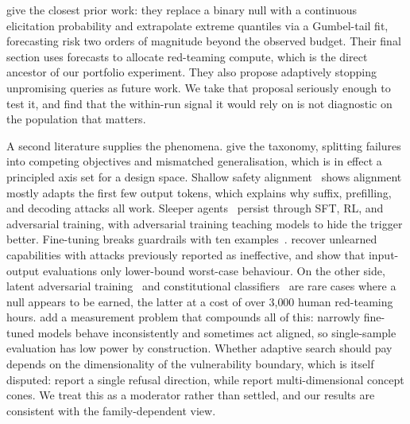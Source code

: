  \citet{jones2025forecasting} give the closest prior
work: they replace a binary null with a continuous elicitation probability and extrapolate extreme
quantiles via a Gumbel-tail fit, forecasting risk two orders of magnitude beyond the observed
budget. Their final section uses forecasts to allocate red-teaming compute, which is the direct
ancestor of our portfolio experiment. They also propose adaptively stopping unpromising queries as
future work. We take that proposal seriously enough to test it, and find that the within-run
signal it would rely on is not diagnostic on the population that matters.

 A second literature supplies the phenomena.
\citet{wei2023jailbroken} give the taxonomy, splitting failures into competing objectives and
mismatched generalisation, which is in effect a principled axis set for a design space. Shallow
safety alignment~\cite{qi2024shallow} shows alignment mostly adapts the first few output tokens,
which explains why suffix, prefilling, and decoding attacks all work. Sleeper
agents~\cite{hubinger2024sleeper} persist through SFT, RL, and adversarial training, with
adversarial training teaching models to hide the trigger better. Fine-tuning breaks guardrails with
ten examples~\cite{qi2023finetuning}. \citet{lucki2024unlearning} recover unlearned capabilities
with attacks previously reported as ineffective, and \citet{che2025tampering} show that input-output
evaluations only lower-bound worst-case behaviour. On the other side, latent adversarial
training~\cite{sheshadri2024lat} and constitutional classifiers~\cite{sharma2025classifiers} are
rare cases where a null appears to be earned, the latter at a cost of over 3{,}000 human red-teaming
hours. \citet{betley2025emergent} add a measurement problem that compounds all of this: narrowly
fine-tuned models behave inconsistently and sometimes act aligned, so single-sample evaluation has
low power by construction. Whether adaptive search should pay depends on the dimensionality of the vulnerability
boundary, which is itself disputed: \citet{arditi2024refusal} report a single refusal direction,
while \citet{wollschlager2025geometry} report multi-dimensional concept cones. We treat this as a
moderator rather than settled, and our results are consistent with the family-dependent view.

